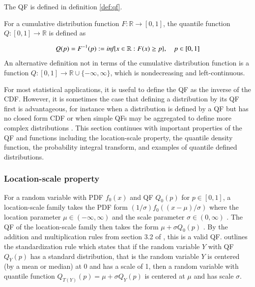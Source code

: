 \documentclass[preprint,12pt,authoryear]{elsarticle}
\begin{document}
The QF is defined in definition \ref{def:qf}.


\begin{definition}
    \label{def:qf}
    For a cumulative distribution function $F: \mathbb{R} \rightarrow [0,1]$, the quantile function $Q: [0,1] \rightarrow \mathbb{R}$ is defined as 
    
    \begin{equation*}
    \label{eq:qf}
        Q(p) = F^{-1}(p) := \emph{inf}\{x \in \mathbb{R} : F(x) \geq p\}, \quad p \in [0,1]
    \end{equation*}
    An alternative definition not in terms of the cumulative distribution function is a function $Q: [0,1] \rightarrow \mathbb{R} \cup \{-\infty, \infty\}$, which is nondecreasing and left-continuous. 
\end{definition}

For most statistical applications, it is useful to define the QF as the inverse of the CDF. However, it is sometimes the case that defining a distribution by its QF first is advantageous, for instance when a distribution is defined by a QF but has no closed form CDF or when simple QFs may be aggregated to define more complex distributions \cite[]{perepolkin2023tenets, gasthaus2019probabilistic, alvarez2023quantile}. This section continues with important properties of the QF and functions including the location-scale property, the quantile density function, the probability integral transform, and examples of quantile defined distributions.

\subsubsection{Location-scale property}
For a random variable with PDF $f_0(x)$ and QF $Q_0(p)$ for $p\in [0,1]$, a location-scale family takes the PDF form $(1/\sigma)f_0((x - \mu)/\sigma)$ where the location parameter $\mu \in (-\infty, \infty)$ and the scale parameter $\sigma \in (0, \infty)$ \cite[]{casella2002statistical}. The QF of the location-scale family then takes the form $\mu + \sigma Q_0(p)$ \cite[]{parzen2004quantile}. By the addition and multiplication rules from section 3.2 of \cite{gilchrist2000statistical}, 
this is a valid QF. \cite{gilchrist2000statistical} outlines the standardization rule which states that if the random variable $Y$ with QF $Q_Y(p)$ has a standard distribution, that is the random variable $Y$ is centered (by a mean or median) at 0 and has a scale of 1, then a random variable with quantile function $Q_{T(Y)}(p) = \mu + \sigma Q_Y(p)$ is centered at $\mu$ and has scale $\sigma$.
\end{document}
